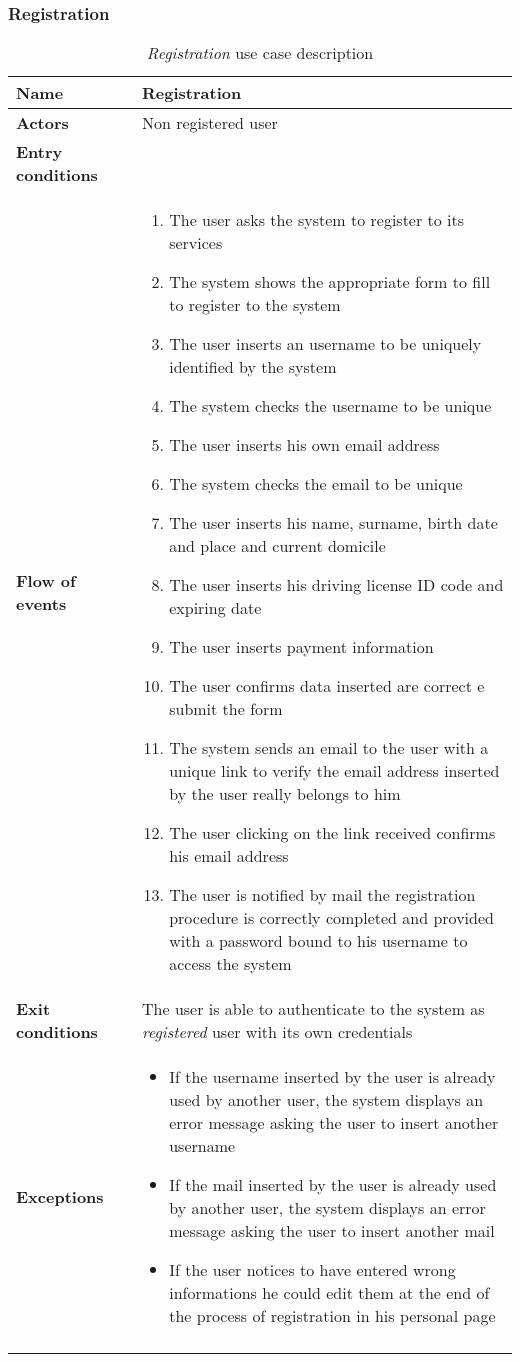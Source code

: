 \subsubsection{Registration}
\begin{longtable}{p{0.25\linewidth}p{0.75\linewidth}}
\toprule
\textbf{Name} & \textbf{Registration} \\
\midrule
\textbf{Actors} & Non registered user \\
\midrule
\textbf{Entry conditions} & \\
\midrule
\textbf{Flow of events} & 
\begin{enumerate}
	\item The user asks the system to register to its services
	\item The system shows the appropriate form to fill to register to the system
	\item The user inserts an username to be uniquely identified by the system
	\item The system checks the username to be unique
	\item The user inserts his own email address
	\item The system checks the email to be unique
	\item The user inserts his name, surname, birth date and place and current domicile
	\item The user inserts his driving license ID code and expiring date
	\item The user inserts payment information
	\item The user confirms data inserted are correct e submit the form
	\item The system sends an email to the user with a unique link to verify the email address inserted by the user really belongs to him
	\item The user clicking on the link received confirms his email address
	\item The user is notified by mail the registration procedure is correctly completed and
	provided with a password bound to his username to access the system
\end{enumerate} \\
\midrule
\textbf{Exit conditions} & The user is able to authenticate to the system as \emph{registered} user with its own credentials\\
\midrule
\textbf{Exceptions} & 
\begin{itemize}
	\item If the username inserted by the user is already used by another user, the system displays an error message asking the user to insert another username
	\item If the mail inserted by the user is already used by another user, the system displays an error message asking the user to insert another mail
	\item If the user notices to have entered wrong informations he could edit them at the end of the process of registration in his personal page
\end{itemize} \\
\bottomrule
\caption{\emph{Registration} use case description}
\end{longtable}

